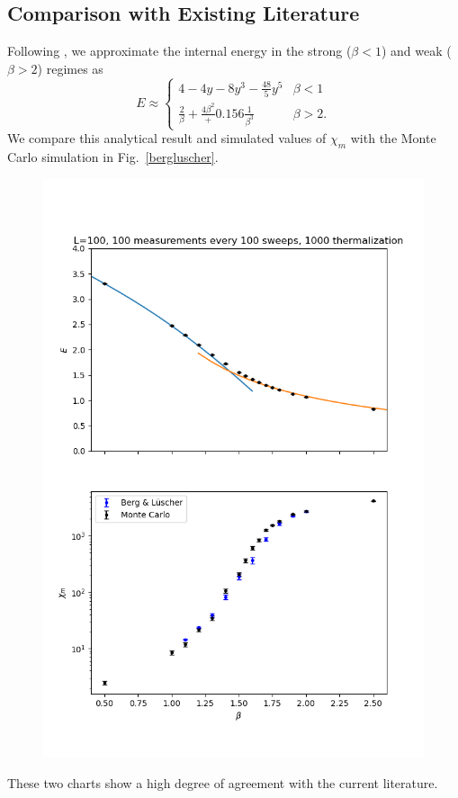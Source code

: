 \documentclass[12pt]{report}
\begin{document}
\subsection{Comparison with Existing Literature}
Following \cite{berg1981}, we approximate the internal energy in the strong ($\beta<1$) and weak ($\beta>2$) regimes as 
\begin{equation}
E \approx \begin{cases} 
    4-4y-8y^3-\frac{48}{5}y^5& \beta<1 \\
    \frac{2}{\beta} + \frac{4\beta^2} + 0.156\frac{1}{\beta^3}& \beta>2. 
\end{cases}
\end{equation}
We compare this analytical result and simulated values of $\chi_m$ with the Monte Carlo simulation in Fig.~\ref{bergluscher}.
\begin{figure}[h]
    \centering
      \includegraphics[width=\textwidth]{imgs/internal_energy.png}
      \caption{\label{fig:bergluscher}}
\end{figure}
These two charts show a high degree of agreement with the current literature.
\end{document}
